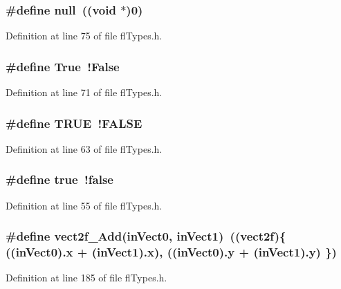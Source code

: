 \subsubsection{\setlength{\rightskip}{0pt plus 5cm}\#define null~((void $\ast$)0)}\label{flTypes_8h_c97b8ee753e4405397a42ad5799b0f9e}




Definition at line 75 of file fl\-Types.h.
\subsubsection{\setlength{\rightskip}{0pt plus 5cm}\#define True~!False}\label{flTypes_8h_dd3ca9eefe3b5b754426f51d3043e579}




Definition at line 71 of file fl\-Types.h.
\subsubsection{\setlength{\rightskip}{0pt plus 5cm}\#define TRUE~!FALSE}\label{flTypes_8h_a8cecfc5c5c054d2875c03e77b7be15d}




Definition at line 63 of file fl\-Types.h.
\subsubsection{\setlength{\rightskip}{0pt plus 5cm}\#define true~!false}\label{flTypes_8h_41f9c5fb8b08eb5dc3edce4dcb37fee7}




Definition at line 55 of file fl\-Types.h.
\subsubsection{\setlength{\rightskip}{0pt plus 5cm}\#define vect2f\_\-Add(in\-Vect0, in\-Vect1)~(({\bf vect2f})\{ ((in\-Vect0).x + (in\-Vect1).x), ((in\-Vect0).y + (in\-Vect1).y) \})}\label{flTypes_8h_41d0d3660a0d10506528885deebf622e}




Definition at line 185 of file fl\-Types.h.
